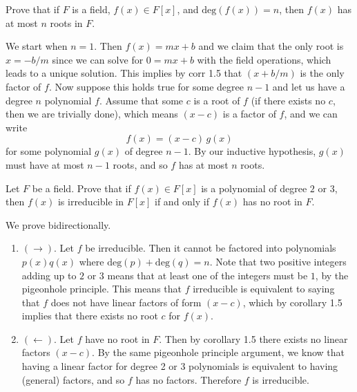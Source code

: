   \begin{exercise}[Shifrin 3.1.6]
    Prove that if $F$ is a field, $f(x) \in F[x]$, and $\mathrm{deg}(f(x)) = n$, then $f(x)$ has at most $n$ roots in $F$. 
  \end{exercise}
  \begin{solution}
    We start when $n=1$. Then $f(x) = mx + b$ and we claim that the only root is $x = -b/m$ since we can solve for $0 = mx + b$ with the field operations, which leads to a unique solution. This implies by corr 1.5 that $(x + b/m)$ is the only factor of $f$. Now suppose this holds true for some degree $n-1$ and let us have a degree $n$ polynomial $f$. Assume that some $c$ is a root of $f$ (if there exists no $c$, then we are trivially done), which means $(x - c)$ is a factor of $f$, and we can write 
    \begin{equation}
      f(x) = (x - c) \, g(x)
    \end{equation}
    for some polynomial $g(x)$ of degree $n-1$. By our inductive hypothesis, $g(x)$ must have at most $n-1$ roots, and so $f$ has at most $n$ roots. 
  \end{solution}

  \begin{exercise}[Shifrin 3.1.8]
    Let $F$ be a field. Prove that if $f(x) \in F[x]$ is a polynomial of degree $2$ or $3$, then $f(x)$ is irreducible in $F[x]$ if and only if $f(x)$ has no root in $F$.
  \end{exercise}
  \begin{solution}
    We prove bidirectionally. 
    \begin{enumerate}
      \item $(\rightarrow)$. Let $f$ be irreducible. Then it cannot be factored into polynomials $p(x) q(x)$ where $\mathrm{deg}(p) + \mathrm{deg}(q) = n$. Note that two positive integers adding up to $2$ or $3$ means that at least one of the integers must be $1$, by the pigeonhole principle. This means that $f$ irreducible is equivalent to saying that $f$ does not have linear factors of form $(x-c)$, which by corollary 1.5 implies that there exists no root $c$ for $f(x)$. 
      \item $(\leftarrow)$. Let $f$ have no root in $F$. Then by corollary 1.5 there exists no linear factors $(x-c)$. By the same pigeonhole principle argument, we know that having a linear factor for degree 2 or 3 polynomials is equivalent to having (general) factors, and so $f$ has no factors. Therefore $f$ is irreducible. 
    \end{enumerate}
  \end{solution}

